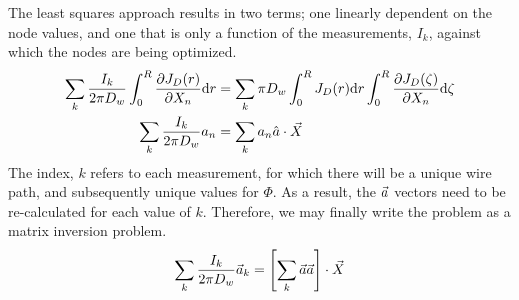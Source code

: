 The least squares approach results in two terms; one linearly dependent on the node values, and one that is only a function of the measurements, $I_k$, against which the nodes are being optimized.  
\begin{align}
\sum_k \frac{I_k}{2\pi D_w} \int_0^R \frac{\partial J_D(r)}{\partial X_n} \mathrm{d}r &= \sum_k \pi D_w \int_0^R J_D(r) \mathrm{d}r \int_0^R \frac{\partial J_D(\zeta)}{\partial X_n} \mathrm{d}\zeta \nonumber\\
\sum_k \frac{I_k}{2\pi D_w} a_n & = \sum_k a_n \hat{a} \cdot \vec{X}
\end{align}
The index, $k$ refers to each measurement, for which there will be a unique wire path, and subsequently unique values for $\Phi$.  As a result, the $\vec{a}$ vectors need to be re-calculated for each value of $k$.  Therefore, we may finally write the problem as a matrix inversion problem.
\begin{align}
\sum_k \frac{I_k}{2\pi D_w} \vec{a}_k = \left[\sum_k \vec{a}\vec{a} \right] \cdot \vec{X}
\end{align}


